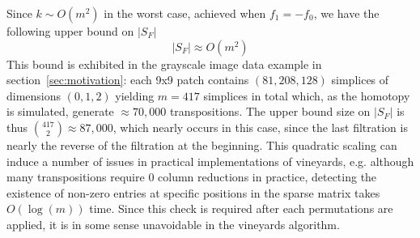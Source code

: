 \documentclass{siamart190516}
\begin{document}
Since $k \sim O(m^2)$ in the worst case, achieved when $f_1 = - f_0$, we have the following upper bound on $\lvert S_F \rvert$
\begin{equation}\label{eq:sf_m2}
	\lvert S_F \rvert \approx O(m^2)
\end{equation}   
 This bound is exhibited in the grayscale image data example in section~\ref{sec:motivation}: each 9x9 patch contains $(81, 208, 128)$ simplices of dimensions $(0, 1, 2)$ yielding $m=417$ simplices in total which, as the homotopy is simulated, generate $\approx 70,\!000$ transpositions. The upper bound size on $\lvert S_F \rvert$ is thus $\binom{417}{2} \approx 87,\!000$, which nearly occurs in this case, since the last filtration is nearly the reverse of the filtration at the beginning.   
 This quadratic scaling can induce a number of issues in practical implementations of vineyards, e.g. although many transpositions require $0$ column reductions in practice, detecting the existence of non-zero entries at specific positions in the sparse matrix takes $O(\log(m))$ time. Since this check is required after each permutations are applied, it is in some sense unavoidable in the vineyards algorithm. 
\end{document}
